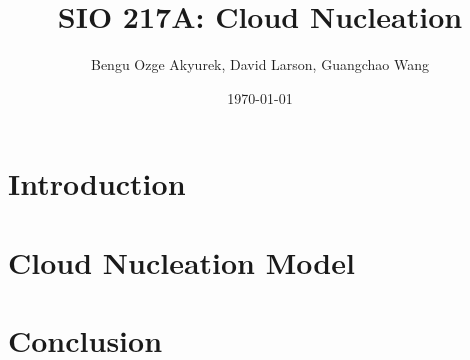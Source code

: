 \documentclass[]{article}
\title{SIO 217A: Cloud Nucleation}
\author{Bengu Ozge Akyurek, David Larson, Guangchao Wang}
\date{\today}
\begin{document}
\maketitle

\section{Introduction}

\section{Cloud Nucleation Model}

\section{Conclusion}
\end{document}
